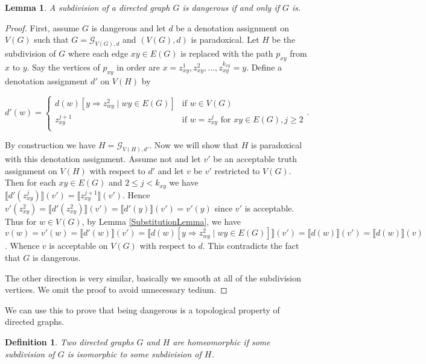 \documentclass[12pt]{article}
\newtheorem{lem}[thm]{Lemma}
\newtheorem{defn}{Definition}
\theoremstyle{remark}
\newcommand{\fancy}[1]{\mathcal{#1}}
\def\G{\fancy{G}}
\begin{document}
\begin{lem}\label{SubdivisionLemma}
A subdivision of a directed graph $G$ is dangerous if and only if $G$ is.
\end{lem}
\begin{proof}
First, assume $G$ is dangerous and let $d$ be a denotation assignment on $V(G)$ such that $G = \G_{V(G), d}$ and $(V(G), d)$ is paradoxical.  Let $H$ be the subdivision of $G$ where each edge $xy \in E(G)$ is replaced with the path $p_{xy}$ from $x$ to $y$.  Say the vertices of $p_{xy}$ in order are $x = z_{xy}^1, z_{xy}^2, \ldots, z_{xy}^{k_{xy}} = y$.  Define a denotation assignment $d'$ on $V(H)$ by

\[d'(w) = \begin{cases}
d(w)[y \Rightarrow z_{wy}^2 \mid wy \in E(G)] & \text{if } w \in V(G) \\
z_{xy}^{j+1} & \text{if } w = z_{xy}^j \text{ for } xy \in E(G), j \geq 2 \\
\end{cases}.\]

By construction we have $H = \G_{V(H), d'}$.  Now we will show that $H$ is paradoxical with this denotation assignment.  Assume not and let $v'$ be an acceptable truth assignment on $V(H)$ with respect to $d'$ and let $v$ be $v'$ restricted to $V(G)$. Then for each $xy \in E(G)$ and $2 \leq j < k_{xy}$ we have $\llbracket d'(z_{xy}^j) \rrbracket(v') = \llbracket z_{xy}^{j + 1} \rrbracket(v')$.  Hence $v'(z_{xy}^2) = \llbracket d'(z_{xy}^2) \rrbracket(v') = \llbracket d'(y) \rrbracket(v') = v'(y)$ since $v'$ is acceptable.  Thus for $w \in V(G)$, by Lemma \ref{SubstitutionLemma}, we have $v(w) = v'(w) = \llbracket d'(w) \rrbracket(v') = \llbracket d(w)[y \Rightarrow z_{wy}^2 \mid wy \in E(G)] \rrbracket(v') = \llbracket d(w) \rrbracket(v') = \llbracket d(w) \rrbracket(v)$.  Whence $v$ is acceptable on $V(G)$ with respect to $d$.  This contradicts the fact that $G$ is dangerous.\newline

The other direction is very similar, basically we smooth at all of the subdivision vertices.  We omit the proof to avoid unnecessary tedium.
\end{proof}

We can use this to prove that being dangerous is a topological property of directed graphs.

\begin{defn}
Two directed graphs $G$ and $H$ are \emph{homeomorphic} if some subdivision of $G$ is isomorphic to some subdivision of $H$.
\end{defn}
\end{document}
